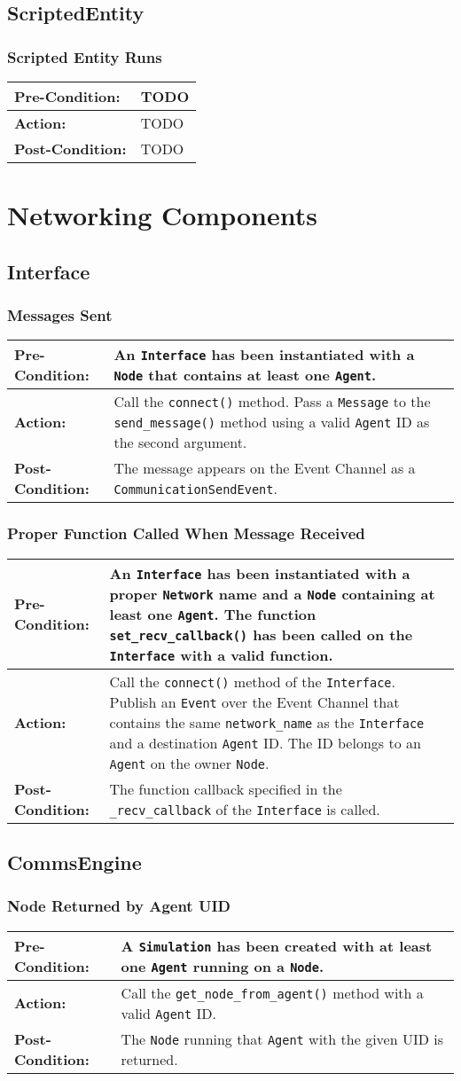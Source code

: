 \documentclass[titlepage]{article}
\newcommand{\testcase}[3]{
    \begin{center}
    \begin{tabular}{| l | p{0.7\textwidth}|}
        \hline
        \rowcolor[gray]{0.8}\textbf{Pre-Condition:} & #1 \\ \hline
        \textbf{Action:} & #2 \\ \hline
        \rowcolor[gray]{0.8}\textbf{Post-Condition:} & #3 \\ \hline
    \end{tabular}
    \end{center}
}
\begin{document}
\subsection{ScriptedEntity}
\subsubsection{Scripted Entity Runs}
\testcase{TODO}{TODO}{TODO}

\section{Networking Components}
\subsection{Interface}
\subsubsection{Messages Sent}
\testcase{An \texttt{Interface} has been instantiated with a \texttt{Node} that contains at least one \texttt{Agent}.}{Call the \texttt{connect()} method. Pass a \texttt{Message} to the \texttt{send\_message()} method using a valid \texttt{Agent} ID as the second argument.}{The message appears on the Event Channel as a \texttt{CommunicationSendEvent}.}

\subsubsection{Proper Function Called When Message Received}
\testcase{An \texttt{Interface} has been instantiated with a proper \texttt{Network} name and a \texttt{Node} containing at least one \texttt{Agent}. The function \texttt{set\_recv\_callback()} has been called on the \texttt{Interface} with a valid function.}{Call the \texttt{connect()} method of the \texttt{Interface}. Publish an \texttt{Event} over the Event Channel that contains the same \texttt{network\_name} as the \texttt{Interface} and a destination \texttt{Agent} ID. The ID belongs to an \texttt{Agent} on the owner \texttt{Node}.}{The function callback specified in the \texttt{\_recv\_callback} of the \texttt{Interface} is called.}

\subsection{CommsEngine}
\subsubsection{Node Returned by Agent UID}
\testcase{A \texttt{Simulation} has been created with at least one \texttt{Agent} running on a \texttt{Node}. }{Call the \texttt{get\_node\_from\_agent()} method with a valid \texttt{Agent} ID.}{The \texttt{Node} running that \texttt{Agent} with the given UID is returned.}
\end{document}
